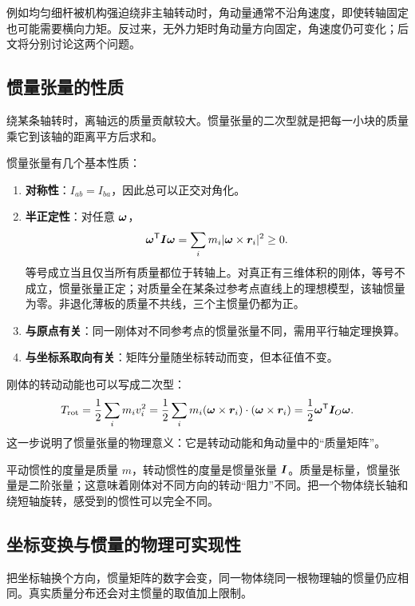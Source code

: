 例如均匀细杆被机构强迫绕非主轴转动时，角动量通常不沿角速度，即使转轴固定也可能需要横向力矩。反过来，无外力矩时角动量方向固定，角速度仍可变化；后文将分别讨论这两个问题。

\subsection{惯量张量的性质}

绕某条轴转时，离轴远的质量贡献较大。惯量张量的二次型就是把每一小块的质量乘它到该轴的距离平方后求和。

惯量张量有几个基本性质：

\begin{enumerate}[leftmargin=1.8em]
  \item \textbf{对称性}：\(I_{ab}=I_{ba}\)，因此总可以正交对角化。
  \item \textbf{半正定性}：对任意 \(\boldsymbol{\omega}\)，
  \[
  \boldsymbol{\omega}^{\mathsf T}\boldsymbol{I}\boldsymbol{\omega}
  =\sum_i m_i|\boldsymbol{\omega}\times\boldsymbol{r}_i|^2\ge 0.
  \]
  等号成立当且仅当所有质量都位于转轴上。对真正有三维体积的刚体，等号不成立，惯量张量正定；对质量全在某条过参考点直线上的理想模型，该轴惯量为零。非退化薄板的质量不共线，三个主惯量仍都为正。
  \item \textbf{与原点有关}：同一刚体对不同参考点的惯量张量不同，需用平行轴定理换算。
  \item \textbf{与坐标系取向有关}：矩阵分量随坐标转动而变，但本征值不变。
\end{enumerate}

刚体的转动动能也可以写成二次型：
\begin{equation}
T_{\rm rot}
=\frac12\sum_i m_i v_i^2
=\frac12\sum_i m_i(\boldsymbol{\omega}\times\boldsymbol{r}_i)\cdot(\boldsymbol{\omega}\times\boldsymbol{r}_i)
=\frac12\boldsymbol{\omega}^{\mathsf T}\boldsymbol{I}_O\boldsymbol{\omega}.
\label{eq:rot-kinetic-energy-tensor}
\end{equation}
这一步说明了惯量张量的物理意义：它是转动动能和角动量中的“质量矩阵”。

\begin{physicsbox}
平动惯性的度量是质量 \(m\)，转动惯性的度量是惯量张量 \(\boldsymbol{I}\)。质量是标量，惯量张量是二阶张量；这意味着刚体对不同方向的转动“阻力”不同。把一个物体绕长轴和绕短轴旋转，感受到的惯性可以完全不同。
\end{physicsbox}

\subsection{坐标变换与惯量的物理可实现性}
把坐标轴换个方向，惯量矩阵的数字会变，同一物体绕同一根物理轴的惯量仍应相同。真实质量分布还会对主惯量的取值加上限制。

